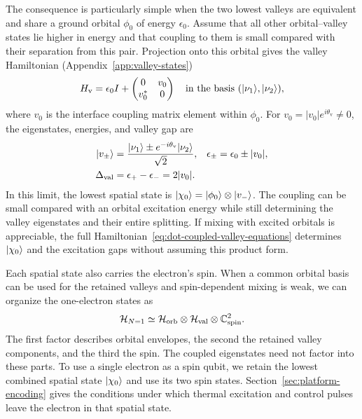 The consequence is particularly simple when the two lowest valleys
are equivalent and share a ground orbital $\phi_0$ of energy
$\epsilon_0$. Assume that all other orbital--valley states lie
higher in energy and that coupling to them is small compared with
their separation from this pair. Projection onto this orbital gives the valley
Hamiltonian (Appendix~\ref{app:valley-states})
\begin{equation}
 H_{\mathrm v}=\epsilon_0 I+
   \begin{pmatrix}0&v_0\\v_0^*&0\end{pmatrix}
 \quad\text{in the basis }(\ket{\nu_1},\ket{\nu_2}),
 \label{eq:dot-valley-doublet}
\end{equation}
where $v_0$ is the interface coupling matrix element within
$\phi_0$. For $v_0=|v_0|e^{i\theta_{\mathrm v}}\ne0$, the
eigenstates, energies, and valley gap are
\begin{equation}
 \begin{aligned}
  \ket{v_\pm}
    &=\frac{\ket{\nu_1}\pm e^{-i\theta_{\mathrm v}}\ket{\nu_2}}
            {\sqrt2},
  &\epsilon_\pm&=\epsilon_0\pm|v_0|,\\
  \Delta_{\mathrm{val}}&=\epsilon_+-\epsilon_-=2|v_0|.
 \end{aligned}
 \label{eq:dot-valley-eigenstates}
\end{equation}
In this limit, the lowest spatial state is
$\lvert \chi_0\rangle=\lvert \phi_0\rangle\otimes\lvert v_-\rangle$. The coupling
can be small compared with an orbital excitation energy while
still determining the valley eigenstates and their entire splitting.
If mixing with excited orbitals is appreciable, the full
Hamiltonian~\eqref{eq:dot-coupled-valley-equations} determines
$\lvert \chi_0\rangle$ and the excitation gaps without assuming this
product form.

Each spatial state also carries the electron's spin. When a common
orbital basis can be used for the retained valleys and spin-dependent
mixing is weak, we can organize the one-electron states as
\begin{equation}
  \Hilb_{N=1}\simeq
  \Hilb_{\mathrm{orb}}\otimes
  \Hilb_{\mathrm{val}}\otimes
  \mathbb{C}^{2}_{\mathrm{spin}}.
  \label{eq:single-electron-space}
\end{equation}
The first factor describes orbital envelopes, the second the
retained valley components, and the third the spin. The coupled
eigenstates need not factor into these parts. To use a single
electron as a spin qubit, we retain the lowest combined spatial
state $\lvert \chi_0\rangle$ and use its two spin states.
Section~\ref{sec:platform-encoding} gives the conditions under
which thermal excitation and control pulses leave the electron
in that spatial state.

